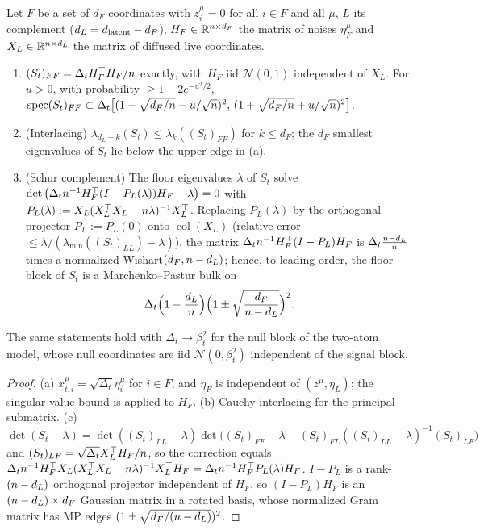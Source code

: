 \begin{lemma}\label{lem:sampling-real}
Let $F$ be a set of $d_F$ coordinates with $z^\mu_i=0$ for all $i\in F$ and all $\mu$, $L$ its complement ($d_L=d_{\mathrm{latent}}-d_F$), $H_F\in\mathbb{R}^{n\times d_F}$ the matrix of noises $\eta^\mu_F$ and $X_L\in\mathbb{R}^{n\times d_L}$ the matrix of diffused live coordinates.
\begin{enumerate}
\item[(a)] $(S_t)_{FF}=\Delta_tH_F^\top H_F/n$ exactly, with $H_F$ iid $\mathcal N(0,1)$ independent of $X_L$. For $u>0$, with probability $\ge1-2e^{-u^2/2}$,
$\operatorname{spec}(S_t)_{FF}\subset\Delta_t\big[(1-\sqrt{d_F/n}-u/\sqrt{n})^2,\,(1+\sqrt{d_F/n}+u/\sqrt{n})^2\big]$.
\item[(b)] (Interlacing) $\lambda_{d_L+k}(S_t)\le\lambda_k((S_t)_{FF})$ for $k\le d_F$; the $d_F$ smallest eigenvalues of $S_t$ lie below the upper edge in (a).
\item[(c)] (Schur complement) The floor eigenvalues $\lambda$ of $S_t$ solve $\det\big(\Delta_tn^{-1}H_F^\top(I-P_L(\lambda))H_F-\lambda\big)=0$ with $P_L(\lambda):=X_L(X_L^\top X_L-n\lambda)^{-1}X_L^\top$. Replacing $P_L(\lambda)$ by the orthogonal projector $P_L:=P_L(0)$ onto $\operatorname{col}(X_L)$ (relative error $\le\lambda/(\lambda_{\min}((S_t)_{LL})-\lambda)$), the matrix $\Delta_tn^{-1}H_F^\top(I-P_L)H_F$ is $\Delta_t\frac{n-d_L}{n}$ times a normalized Wishart$(d_F,n-d_L)$; hence, to leading order, the floor block of $S_t$ is a Marchenko--Pastur bulk on
\begin{equation}\label{eq:mp-floor-real}
\Delta_t\Big(1-\frac{d_L}{n}\Big)\Big(1\pm\sqrt{\frac{d_F}{n-d_L}}\Big)^2 .
\end{equation}
\end{enumerate}
The same statements hold with $\Delta_t\to\beta_t^2$ for the null block of the two-atom model, whose null coordinates are iid $\mathcal N(0,\beta_t^2)$ independent of the signal block.
\end{lemma}
\begin{proof}
(a) $x^\mu_{t,i}=\sqrt{\Delta_t}\eta^\mu_i$ for $i\in F$, and $\eta_F$ is independent of $(z^\mu,\eta_L)$; the singular-value bound is \citet[Cor.~7.3.3]{vershynin2018hdp} applied to $H_F$. (b) Cauchy interlacing for the principal submatrix. (c) $\det(S_t-\lambda)=\det((S_t)_{LL}-\lambda)\det\big((S_t)_{FF}-\lambda-(S_t)_{FL}((S_t)_{LL}-\lambda)^{-1}(S_t)_{LF}\big)$ and $(S_t)_{LF}=\sqrt{\Delta_t}X_L^\top H_F/n$, so the correction equals $\Delta_tn^{-1}H_F^\top X_L(X_L^\top X_L-n\lambda)^{-1}X_L^\top H_F=\Delta_tn^{-1}H_F^\top P_L(\lambda)H_F$. $I-P_L$ is a rank-$(n-d_L)$ orthogonal projector independent of $H_F$, so $(I-P_L)H_F$ is an $(n-d_L)\times d_F$ Gaussian matrix in a rotated basis, whose normalized Gram matrix has MP edges $(1\pm\sqrt{d_F/(n-d_L)})^2$.
\end{proof}
